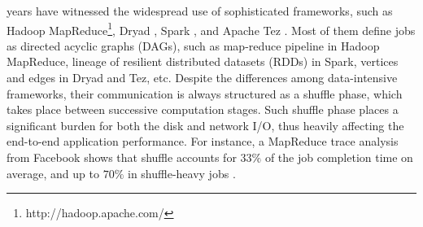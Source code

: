  years have witnessed the widespread use of sophisticated frameworks, such as Hadoop MapReduce\footnote{http://hadoop.apache.com/}, Dryad \cite{dryad}, Spark \cite{spark}, and Apache Tez \cite{tez}.
Most of them define jobs as directed acyclic graphs (DAGs), such as map-reduce pipeline in Hadoop MapReduce, lineage of resilient distributed datasets (RDDs) in Spark, vertices and edges in Dryad and Tez, etc.
Despite the differences among data-intensive frameworks, their communication is always structured as a shuffle phase,  which takes place between successive computation stages. 
Such shuffle phase places a significant burden for both the disk and network I/O, thus heavily affecting the end-to-end application performance. 
For instance, a MapReduce trace analysis from Facebook shows that shuffle accounts for $33\%$ of the job completion time on average, and up to $70\%$ in shuffle-heavy jobs \cite{managing}.

